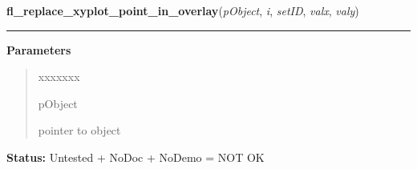 \hspace{.8\funcindent}\begin{boxedminipage}{\funcwidth}

    \raggedright \textbf{fl\_replace\_xyplot\_point\_in\_overlay}(\textit{pObject}, \textit{i}, \textit{setID}, \textit{valx}, \textit{valy})

    \vspace{-1.5ex}

    \rule{\textwidth}{0.5\fboxrule}
\setlength{\parskip}{2ex}
\setlength{\parskip}{1ex}
      \textbf{Parameters}
      \vspace{-1ex}

      \begin{quote}
        \begin{Ventry}{xxxxxxx}

          \item[pObject]

          pointer to object

        \end{Ventry}

      \end{quote}

\textbf{Status:} Untested + NoDoc + NoDemo = NOT OK



    \end{boxedminipage}

    \label{xformslib:library:fl_get_xyplot_xmapping}

    \vspace{0.5ex}

